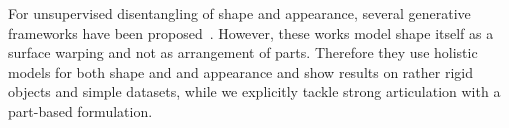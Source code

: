 	For unsupervised disentangling of shape and appearance, several generative frameworks have been proposed~\cite{shu18shapeappear, xing18shapeappear}.
	However, these works model shape itself as a surface warping and not as arrangement of parts. Therefore they use holistic models for both shape and and appearance and show results on rather rigid objects and simple datasets, while we explicitly tackle strong articulation with a part-based formulation.

